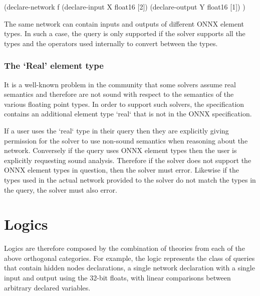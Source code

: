 \begin{code}[style=lbnf]
(declare-network f
    (declare-input  X float16 [2])
    (declare-output Y float16 [1])
)
\end{code}

The same network can contain inputs and outputs of different ONNX element types. In such a case, the query is only supported if the solver supports all the types and the operators used internally to convert between the types.


\subsubsection{The `Real' element type}

It is a well-known problem in the community that some solvers assume real semantics and therefore are not sound with respect to the semantics of the various floating point types. In order to support such solvers, the specification contains an additional element type `real` that is not in the ONNX specification.

If a user uses the `real` type in their query then they are explicitly giving permission for the solver to use non-sound semantics when reasoning about the network. Conversely if the query uses ONNX element types then the user is explicitly requesting sound analysis. Therefore if the solver does not support the ONNX element types in question, then the solver must error. Likewise if the types used in the actual network provided to the solver do not match the types in the query, the solver must also error.

\section{Logics}

Logics are therefore composed by the combination of theories from each of the above orthogonal categories. For example, the logic  represents the class of queries that contain hidden nodes declarations, a single network declaration with a single input and output using the 32-bit floats, with linear comparisons between arbitrary declared variables.
